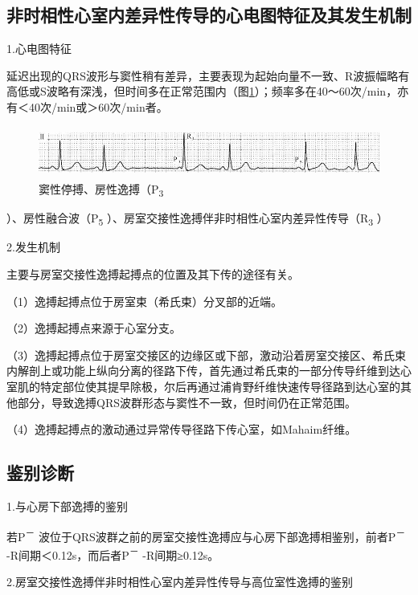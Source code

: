 \subsection{非时相性心室内差异性传导的心电图特征及其发生机制}

1.心电图特征

延迟出现的QRS波形与窦性稍有差异，主要表现为起始向量不一致、R波振幅略有高低或S波略有深浅，但时间多在正常范围内（图\ref{fig12-9}）；频率多在40～60次/min，亦有＜40次/min或＞60次/min者。

\begin{figure}[!htbp]
 \centering
 \includegraphics[width=5.58333in,height=0.66667in]{./images/Image00202.jpg}
 \captionsetup{justification=centering}
 \caption{窦性停搏、房性逸搏（P\textsubscript{3}}
 \label{fig12-9}
  \end{figure} 
）、房性融合波（P\textsubscript{5}
）、房室交接性逸搏伴非时相性心室内差异性传导（R\textsubscript{3} ）

2.发生机制

主要与房室交接性逸搏起搏点的位置及其下传的途径有关。

（1）逸搏起搏点位于房室束（希氏束）分叉部的近端。

（2）逸搏起搏点来源于心室分支。

（3）逸搏起搏点位于房室交接区的边缘区或下部，激动沿着房室交接区、希氏束内解剖上或功能上纵向分离的径路下传，首先通过希氏束的一部分传导纤维到达心室肌的特定部位使其提早除极，尔后再通过浦肯野纤维快速传导径路到达心室的其他部分，导致逸搏QRS波群形态与窦性不一致，但时间仍在正常范围。

（4）逸搏起搏点的激动通过异常传导径路下传心室，如Mahaim纤维。

\protect\hypertarget{text00019.htmlux5cux23subid184}{}{}

\subsection{鉴别诊断}

1.与心房下部逸搏的鉴别

若P\textsuperscript{－}
波位于QRS波群之前的房室交接性逸搏应与心房下部逸搏相鉴别，前者P\textsuperscript{－}
-R间期＜0.12s，而后者P\textsuperscript{－} -R间期≥0.12s。

2.房室交接性逸搏伴非时相性心室内差异性传导与高位室性逸搏的鉴别

